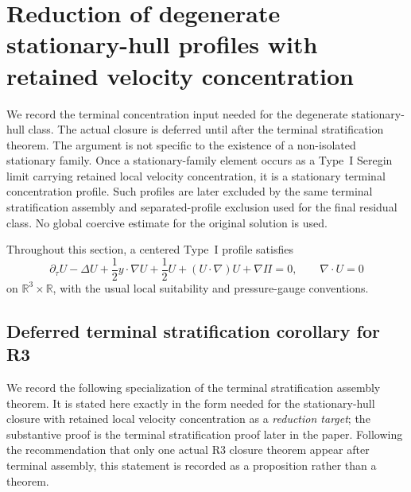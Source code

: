 \documentclass[11pt]{amsart}
\numberwithin{equation}{section}
\theoremstyle{plain}
\theoremstyle{definition}
\theoremstyle{remark}
\begin{document}
\section{Reduction of degenerate stationary-hull profiles with retained velocity concentration}
\label{sec:R3-terminal-stratification-closure}

We record the terminal concentration input needed for the degenerate stationary-hull
class.  The actual closure is deferred until after the terminal stratification
theorem.  The argument is not specific to the existence of a
non-isolated stationary family.  Once a stationary-family element occurs as
a Type~I Seregin limit carrying retained local velocity concentration, it is a
stationary terminal concentration profile.  Such profiles are later excluded by the
same terminal stratification assembly and separated-profile exclusion used
for the final residual class.  No global coercive
estimate for the original solution is used.

Throughout this section, a centered Type~I profile satisfies
\begin{equation}\label{eq:R3S-centered}
   \partial_\tau U-\Delta U+\frac12 y\cdot\nabla U+\frac12 U
   +(U\cdot\nabla)U+\nabla \Pi=0,
   \qquad \nabla\cdot U=0
\end{equation}
on \(\mathbb R^3\times\mathbb R\), with the usual local suitability and
pressure-gauge conventions.

\subsection{Deferred terminal stratification corollary for R3}

We record the following specialization of the terminal stratification assembly
theorem.  It is stated here exactly in the form needed for the stationary-hull
closure with retained local velocity concentration as a \emph{reduction
target}; the substantive proof is the terminal stratification proof later in
the paper.  Following the recommendation that only one actual R3 closure
theorem appear after terminal assembly, this statement is recorded as a
proposition rather than a theorem.
\end{document}
